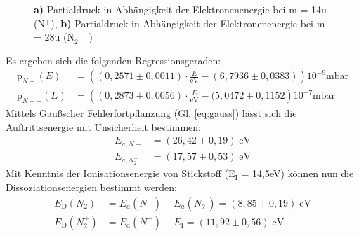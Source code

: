 \begin{figure}[h]
	\centering
	\caption{\textbf{a)} Partialdruck in Abhängigkeit der Elektronenenergie bei m = 14\;u (N$^+$), \textbf{b)} Partialdruck in Abhängigkeit der Elektronenenergie bei m = 28\;u (N$_2^{++}$)}
	\label{fig:plot_stickstoff}
\end{figure}
Es ergeben sich die folgenden Regressionsgeraden:
\begin{align}
\textrm{p}_{N+}(E) &= \left((0,2571\pm 0,0011)\cdot\frac{E}{\textrm{eV}} - (6,7936\pm 0,0383)\right)10^{-9}\textrm{mbar}\\
\textrm{p}_{N++}(E) &= \left((0,2873\pm 0,0056)\cdot\frac{E}{\textrm{eV}} - (5,0472\pm 0,1152\right)10^{-7}\textrm{mbar}
\end{align}
Mittels Gaußscher Fehlerfortpflanzung (Gl. \ref{eq:gauss}) lässt sich die Auftrittsenergie mit Unsicherheit bestimmen:
\begin{align}
E_{a,N+} &= (26,42\pm 0,19)\;\textrm{eV}\\
E_{a,N_2^+} &= (17,57\pm 0,53)\;\textrm{eV}
\end{align}
Mit Kenntnis der Ionisationsenergie von Stickstoff (E$_\textrm{I}$ = 14,5\;eV) können nun die Dissoziationsenergien bestimmt werden:
\begin{align}
	E_\textrm{D}(N_2) &= E_a(N^+) - E_a(N_2^+) = (8,85\pm 0,19)\;\textrm{eV}\\
	E_\textrm{D}(N_2^+) &= E_a(N^+) - E_\textrm{I} = (11,92\pm 0,56)\;\textrm{eV}
\end{align}
